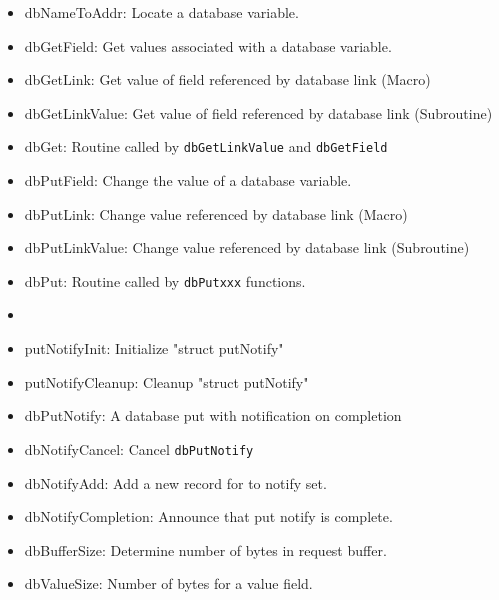 \begin{itemize}\item dbNameToAddr: Locate a database variable.



\item dbGetField: Get values associated with a database variable.

\item dbGetLink: Get value of field referenced by database link (Macro)

\item dbGetLinkValue: Get value of field referenced by database link (Subroutine)

\item dbGet: Routine called by \verb|dbGetLinkValue| and \verb|dbGetField|



\item dbPutField: Change the value of a database variable.

\item dbPutLink: Change value referenced by database link (Macro)

\item dbPutLinkValue: Change value referenced by database link (Subroutine)

\item dbPut: Routine called by \verb|dbPutxxx| functions.

\item 

\item putNotifyInit: Initialize "struct putNotify"

\item putNotifyCleanup: Cleanup "struct putNotify"

\item dbPutNotify: A database put with notification on completion

\item dbNotifyCancel: Cancel \verb|dbPutNotify|

\item dbNotifyAdd: Add a new record for to notify set.

\item dbNotifyCompletion: Announce that put notify is complete.



\item dbBufferSize: Determine number of bytes in request buffer.

\item dbValueSize: Number of bytes for a value field.


\end{itemize}
